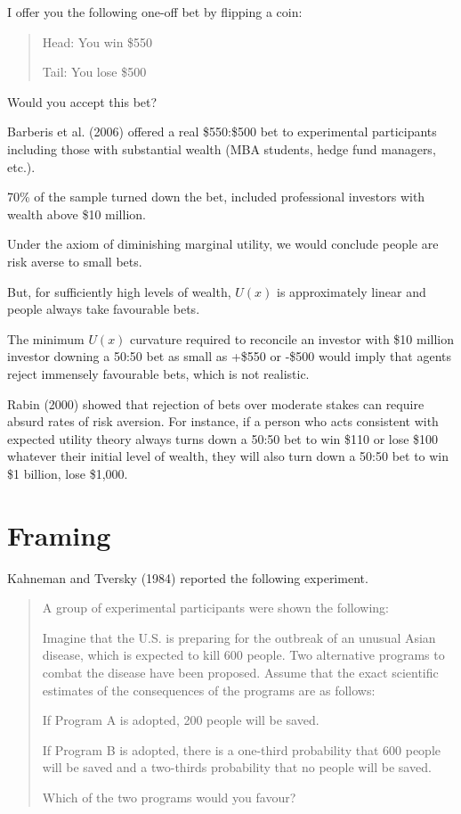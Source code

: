 \documentclass[
  letterpaper,
  DIV=11,
  numbers=noendperiod]{scrreprt}
\begin{document}
I offer you the following one-off bet by flipping a coin:

\begin{quote}
Head: You win \$550

Tail: You lose \$500
\end{quote}

Would you accept this bet?

Barberis et al. (2006) offered a real \$550:\$500 bet to experimental
participants including those with substantial wealth (MBA students,
hedge fund managers, etc.).

70\% of the sample turned down the bet, included professional investors
with wealth above \$10 million.

Under the axiom of diminishing marginal utility, we would conclude
people are risk averse to small bets.

But, for sufficiently high levels of wealth, \(U(x)\) is approximately
linear and people always take favourable bets.

The minimum \(U(x)\) curvature required to reconcile an investor with
\$10 million investor downing a 50:50 bet as small as +\$550 or -\$500
would imply that agents reject immensely favourable bets, which is not
realistic.

Rabin (2000) showed that rejection of bets over moderate stakes can
require absurd rates of risk aversion. For instance, if a person who
acts consistent with expected utility theory always turns down a 50:50
bet to win \$110 or lose \$100 whatever their initial level of wealth,
they will also turn down a 50:50 bet to win \$1 billion, lose \$1,000.

\hypertarget{framing}{%
\section{Framing}\label{framing}}

Kahneman and Tversky (1984) reported the following experiment.

\begin{quote}
A group of experimental participants were shown the following:

Imagine that the U.S. is preparing for the outbreak of an unusual Asian
disease, which is expected to kill 600 people. Two alternative programs
to combat the disease have been proposed. Assume that the exact
scientific estimates of the consequences of the programs are as follows:

If Program A is adopted, 200 people will be saved.

If Program B is adopted, there is a one-third probability that 600
people will be saved and a two-thirds probability that no people will be
saved.

Which of the two programs would you favour?
\end{quote}
\end{document}
